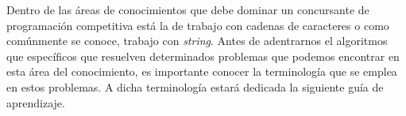 Dentro de las áreas de conocimientos que debe dominar un concursante de programación competitiva está la de trabajo con cadenas de caracteres o como comúnmente se conoce, trabajo con \emph{string}. Antes de adentrarnos el algoritmos que específicos que resuelven determinados problemas que podemos encontrar en esta área del conocimiento, es importante conocer la terminología que se emplea en estos problemas. A dicha terminología estará dedicada la siguiente guía de aprendizaje.     